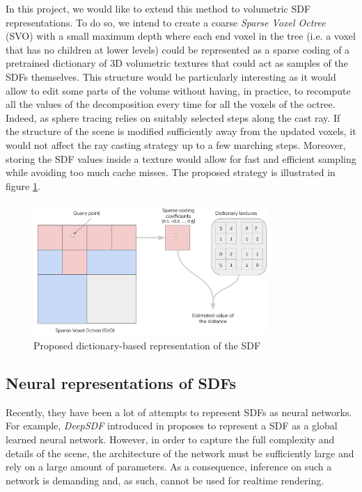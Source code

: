 \documentclass[10pt,a4paper,english, twocolumn]{article}
\begin{document}
In this project, we would like to extend this method to volumetric SDF representations. To do so, we intend to create a coarse \textit{Sparse Voxel Octree} (SVO) with a small maximum depth where each end voxel in the tree (i.e. a voxel that has no children at lower levels) could be represented as a sparse coding of a pretrained dictionary of 3D volumetric textures that could act as samples of the SDFs themselves. This structure would be particularly interesting as it would allow to edit some parts of the volume without having, in practice, to recompute all the values of the decomposition every time for all the voxels of the octree. Indeed, as sphere tracing relies on suitably selected steps along the cast ray. If the structure of the scene is modified sufficiently away from the updated voxels, it would not affect the ray casting strategy up to a few marching steps. Moreover, storing the SDF values inside a texture would allow for fast and efficient sampling while avoiding too much cache misses. The proposed strategy is illustrated in figure \ref{fig:sparse-coding-sdf}.

\begin{figure}[h]
    \centering
    \includegraphics[width=0.8\textwidth]{figures/sparse-coding-sdf.png}
    \caption{Proposed dictionary-based representation of the SDF}
    \label{fig:sparse-coding-sdf}
\end{figure}

\subsection{Neural representations of SDFs}
\label{ssec:neural-sdf}
Recently, they have been a lot of attempts to represent SDFs as neural networks. For example, \textit{DeepSDF} introduced in \cite{Park_2019_CVPR} proposes to represent a SDF as a global learned neural network. However, in order to capture the full complexity and details of the scene, the architecture of the network must be sufficiently large and rely on a large amount of parameters. As a consequence, inference on such a network is demanding and, as such, cannot be used for realtime rendering.
\end{document}
